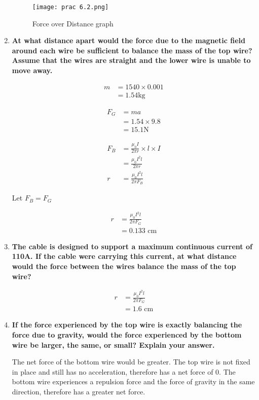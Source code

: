 \begin{enumerate}
			\begin{figure}
				\centering
				\texttt{[image: prac 6.2.png]}
				\caption{Force over Distance graph}
			\end{figure}

			\item \textbf{At what distance apart would the force due to the magnetic field around each wire be sufficient to balance the mass of the top wire? Assume that the wires are straight and the lower wire is unable to move away.}
			
				\begin{align*}
					m &= 1540 \times 0.001 \\
					  &= 1.54 \text{kg}
				\end{align*}

				\begin{align*}
					F_G &= ma \\
					    &= 1.54 \times 9.8 \\
					    &= 15.1 \text{N}
				\end{align*}
				
				\begin{align*}
					F_B &= \frac{\mu_0 I}{2 \pi r} \times l \times I \\
					    &= \frac{\mu_0 I^2 l}{2 \pi r} \\
					r &= \frac{\mu_0 I^2 l}{2 \pi F_B}
				\end{align*}

				\begin{center}
					Let $F_B = F_G$
				\end{center}
				
				\begin{align*}
					r &= \frac{\mu_0 I^2 l}{2 \pi F_G} \\
					  &= 0.133 \text{ cm}
				\end{align*}

			\item \textbf{The cable is designed to support a maximum continuous current of 110A. If the cable were carrying this current, at what distance would the force between the wires balance the mass of the top wire?}

				\begin{align*}
					r &= \frac{\mu_0 I^2 l}{2 \pi F_G} \\
					  &= 1.6 \text{ cm}
				\end{align*}

			\item \textbf{If the force experienced by the top wire is exactly balancing the force due to gravity, would the force experienced by the bottom wire be larger, the same, or small? Explain your answer.}

				The net force of the bottom wire would be greater. The top wire is not fixed in place and still has no acceleration, therefore has a net force of 0. The bottom wire experiences a repulsion force and the force of gravity in the same direction, therefore has a greater net force.
		\end{enumerate}
